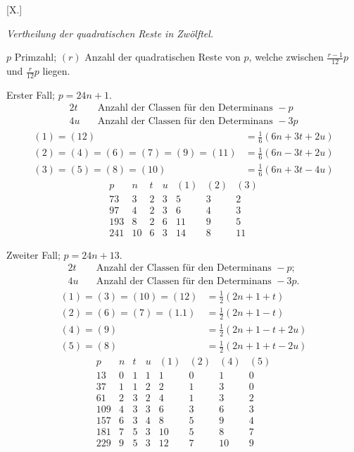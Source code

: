 \par\bigskip{}\centerline{[X.]}\medskip
\begin{center}\emph{Vertheilung der quadratischen Reste in Zwölftel.}\end{center}
$p$ Primzahl; $(r)$ Anzahl der quadratischen Reste von $p$, welche zwischen $\frac{r-1}{12}p$ und $\frac r{12}p$ liegen.

Erster Fall; $p=24n+1$.
\[
\begin{aligned}
2t&\quad\text{Anzahl der Classen für den Determinans }-p\\
4u&\quad\text{Anzahl der Classen für den Determinans }-3p
\end{aligned}
\]
\[
\begin{aligned}
(1)=(12)&=\tfrac16(6n+3t+2u)\\
(2)=(4)=(6)=(7)=(9)=(11)&=\tfrac16(6n-3t+2u)\\
(3)=(5)=(8)=(10)&=\tfrac16(6n+3t-4u)
\end{aligned}
\]
\[
\begin{array}{r|r|r|r|r|r|r}
p&n&t&u&(1)&(2)&(3)\\\hline
73&3&2&3&5&3&2\\
97&4&2&3&6&4&3\\
193&8&2&6&11&9&5\\
241&10&6&3&14&8&11
\end{array}
\]

Zweiter Fall; $p=24n+13$.
\[
\begin{aligned}
2t&\quad\text{Anzahl der Classen für den Determinans }-p;\\
4u&\quad\text{Anzahl der Classen für den Determinans }-3p.
\end{aligned}
\]
\[
\begin{aligned}
(1)=(3)=(10)=(12)&=\tfrac12(2n+1+t)\\
(2)=(6)=(7)=(1.1)&=\tfrac12(2n+1-t)\\
(4)=(9)&=\tfrac12(2n+1-t+2u)\\
(5)=(8)&=\tfrac12(2n+1+t-2u)
\end{aligned}
\]
\[
\begin{array}{r|r|r|r|r|r|r|r}
p&n&t&u&(1)&(2)&(4)&(5)\\\hline
13&0&1&1&1&0&1&0\\
37&1&1&2&2&1&3&0\\
61&2&3&2&4&1&3&2\\
109&4&3&3&6&3&6&3\\
157&6&3&4&8&5&9&4\\
181&7&5&3&10&5&8&7\\
229&9&5&3&12&7&10&9
\end{array}
\]

